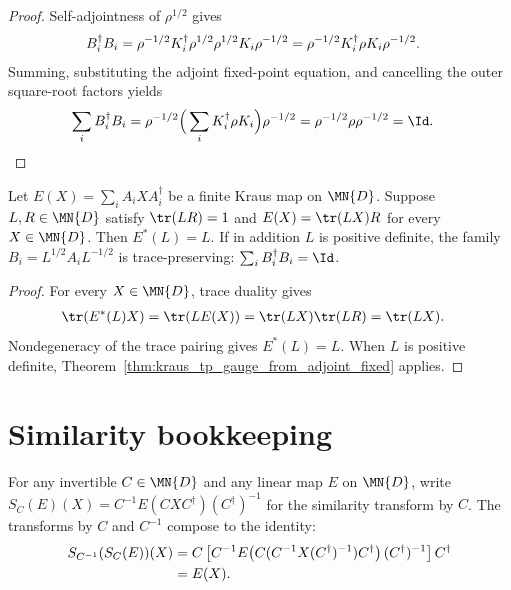 \begin{proof}\leanok
    Self-adjointness of $\rho^{1/2}$ gives
    \begin{align}
        B_i^\dagger B_i
         & =\rho^{-1/2}K_i^\dagger\rho^{1/2}\rho^{1/2}K_i\rho^{-1/2}
          =\rho^{-1/2}K_i^\dagger\rho K_i\rho^{-1/2}.
        \notag
    \end{align}
    Summing, substituting the adjoint fixed-point equation, and cancelling the
    outer square-root factors yields
    \begin{align}
        \sum_iB_i^\dagger B_i
         & =\rho^{-1/2}\Big(\sum_iK_i^\dagger\rho K_i\Big)\rho^{-1/2}
          =\rho^{-1/2}\rho\rho^{-1/2}
          =\Id.
        \notag
    \end{align}
\end{proof}

\begin{theorem}%
    \label{thm:qpf_trace_factor_gauge}
    \leanok
    Let $E(X)=\sum_i A_i X A_i^\dagger$ be a finite Kraus map on
    $\MN{D}$. Suppose $L,R\in\MN{D}$ satisfy $\tr(LR)=1$ and
    $E(X)=\tr(LX)R$ for every $X\in\MN{D}$.
    Then $E^*(L)=L$. If in addition $L$ is positive definite, the family
    $B_i=L^{1/2}A_iL^{-1/2}$ is trace-preserving:
    $\sum_i B_i^\dagger B_i=\Id$.
\end{theorem}

\begin{proof}\leanok
    For every $X\in\MN{D}$, trace duality gives
    \begin{align}
        \tr(E^*(L)X)
         & =\tr(LE(X))=\tr(LX)\tr(LR)=\tr(LX).
        \notag
    \end{align}
    Nondegeneracy of the trace pairing gives $E^*(L)=L$.
    When $L$ is positive definite,
    Theorem~\ref{thm:kraus_tp_gauge_from_adjoint_fixed} applies.
\end{proof}

\section{Similarity bookkeeping}
\label{sec:app_qpf_similarity}

\begin{lemma}%
    \label{lem:similarity_involution}
    \leanok
    For any invertible $C \in \MN{D}$ and any linear map $E$ on $\MN{D}$,
    write $S_C(E)(X)=C^{-1}E(CXC^\dagger)(C^\dagger)^{-1}$ for the
    similarity transform by $C$. The transforms by $C$ and $C^{-1}$ compose
    to the identity:
    \begin{align}
        S_{C^{-1}}(S_C(E))(X)
         & =C\left[C^{-1}E\!\left(C(C^{-1}X(C^\dagger)^{-1})C^\dagger\right)
                 (C^\dagger)^{-1}\right]C^\dagger \notag \\
         & =E(X).
        \label{eq:qpf_similarity_involution}
    \end{align}
\end{lemma}

